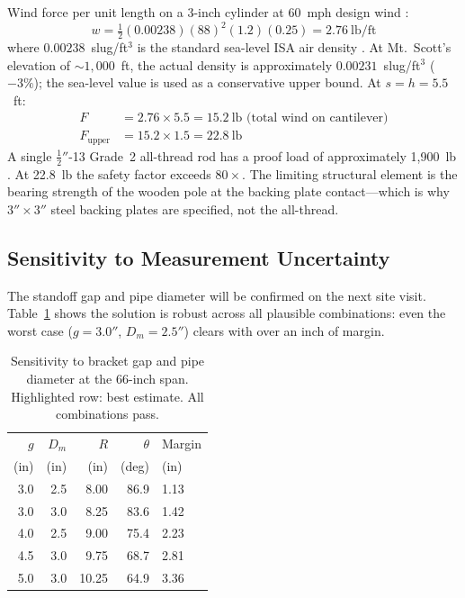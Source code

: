 \documentclass[11pt,twocolumn]{article}
\begin{document}
Wind force per unit length on a 3-inch cylinder at 60~mph design wind
\cite{ASCE722}:
%
\begin{equation}
  w = \tfrac{1}{2}(0.00238)(88)^2(1.2)(0.25) = 2.76~\text{lb/ft}
\end{equation}
%
where $0.00238$~slug/ft$^3$ is the standard sea-level ISA air density
\cite{ISA1975}. At Mt.~Scott's elevation of $\sim\!1{,}000$~ft, the actual
density is approximately $0.00231$~slug/ft$^3$ ($-3\%$); the sea-level value
is used as a conservative upper bound.
%
At $s = h = 5.5$~ft:
\begin{align*}
  F &= 2.76 \times 5.5 = 15.2~\text{lb (total wind on cantilever)} \\
  F_\text{upper} &= 15.2 \times 1.5 = 22.8~\text{lb}
\end{align*}
%
A single $\tfrac{1}{2}''$-13 Grade~2 all-thread rod has a proof load of
approximately 1,900~lb \cite{SAE429}. At 22.8~lb the safety factor exceeds
$80\times$. The limiting structural element is the bearing strength of the
wooden pole at the backing plate contact---which is why $3'' \times 3''$ steel
backing plates are specified, not the all-thread.

\subsection{Sensitivity to Measurement Uncertainty}

The standoff gap and pipe diameter will be confirmed on the next site visit.
Table~\ref{tab:sensitivity} shows the solution is robust across all plausible
combinations: even the worst case ($g = 3.0''$, $D_m = 2.5''$) clears with
over an inch of margin.

\begin{table}[h]
\centering\small
\begin{tabular}{@{}rrrrl@{}}
\toprule
$g$ & $D_m$ & $R$ & $\theta$ & Margin \\
(in) & (in) & (in) & (deg) & (in) \\
\midrule
3.0 & 2.5 & 8.00 & 86.9 & 1.13 \\
3.0 & 3.0 & 8.25 & 83.6 & 1.42 \\
4.0 & 2.5 & 9.00 & 75.4 & 2.23 \\
\rowcolor{gray!10}
4.5 & 3.0 & 9.75 & 68.7 & 2.81 \\
5.0 & 3.0 & 10.25 & 64.9 & 3.36 \\
\bottomrule
\end{tabular}
\caption{Sensitivity to bracket gap and pipe diameter at the
66-inch span. Highlighted row: best estimate. All combinations pass.}
\label{tab:sensitivity}
\end{table}
\end{document}

